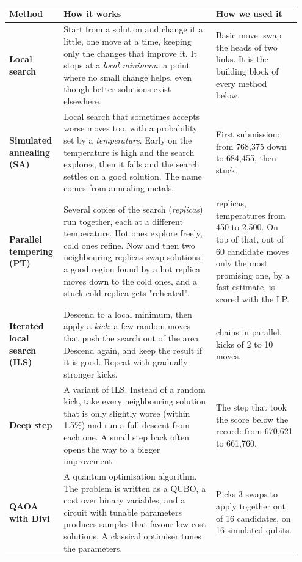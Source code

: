 \documentclass[a4paper,10pt]{article}
\newcommand{\reportheading}[1]{\par\Needspace{3\baselineskip}\vspace{3pt}{\fontsize{11}{14}\selectfont\bfseries #1}\par\nopagebreak}
\begin{document}
\reportheading{The methods, briefly}
{\fontsize{8}{10}\selectfont
\renewcommand{\arraystretch}{1.23}
\begin{tabular}{@{}>{\raggedright\arraybackslash}p{0.1615\linewidth}>{\raggedright\arraybackslash}p{0.5035\linewidth}>{\raggedright\arraybackslash}p{0.2850\linewidth}@{}}
\textbf{Method} & \textbf{How it works} & \textbf{How we used it} \\
\midrule
\textbf{Local search} & Start from a solution and change it a little, one move at a time, keeping only the changes that improve it. It stops at a \textit{local minimum}: a point where no small change helps, even though better solutions exist elsewhere. & Basic move: swap the heads of two links. It is the building block of every method below. \\
\midrule
\textbf{Simulated annealing (SA)} & Local search that sometimes accepts worse moves too, with a probability set by a \textit{temperature}. Early on the temperature is high and the search explores; then it falls and the search settles on a good solution. The name comes from annealing metals. & First submission: from 768,375 down to 684,455, then stuck. \\
\midrule
\textbf{Parallel tempering (PT)} & Several copies of the search (\textit{replicas}) run together, each at a different temperature. Hot ones explore freely, cold ones refine. Now and then two neighbouring replicas swap solutions: a good region found by a hot replica moves down to the cold ones, and a stuck cold replica gets "reheated". & 10 replicas, temperatures from 450 to 2,500. On top of that, out of 60 candidate moves only the most promising one, by a fast estimate, is scored with the LP. \\
\midrule
\textbf{Iterated local search (ILS)} & Descend to a local minimum, then apply a \textit{kick}: a few random moves that push the search out of the area. Descend again, and keep the result if it is good. Repeat with gradually stronger kicks. & 5 chains in parallel, kicks of 2 to 10 moves. \\
\midrule
\textbf{Deep step} & A variant of ILS. Instead of a random kick, take every neighbouring solution that is only slightly worse (within 1.5\%) and run a full descent from each one. A small step back often opens the way to a bigger improvement. & The step that took the score below the record: from 670,621 to 661,760. \\
\midrule
\textbf{QAOA with Divi} & A quantum optimisation algorithm. The problem is written as a QUBO, a cost over binary variables, and a circuit with tunable parameters produces samples that favour low-cost solutions. A classical optimiser tunes the parameters. & Picks 3 swaps to apply together out of 16 candidates, on 16 simulated qubits. \\
\end{tabular}\par
}
\end{document}
